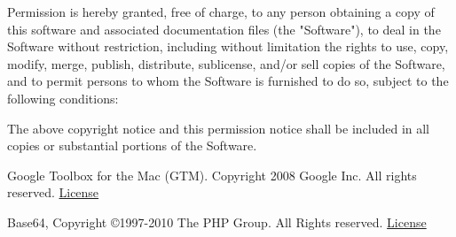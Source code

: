 \documentclass[oneside, openany, 12pt]{tufte-book}
\newcommand{\licensetext}{\scriptsize \setlength{\parskip}{0mm} \singlespacing}
\begin{document}
{\licensetext Permission is hereby granted, free of charge, to any person obtaining a copy
of this software and associated documentation files (the "Software"), to deal
in the Software without restriction, including without limitation the rights
to use, copy, modify, merge, publish, distribute, sublicense, and/or sell
copies of the Software, and to permit persons to whom the Software is
furnished to do so, subject to the following conditions:

The above copyright notice and this permission notice shall be included in
all copies or substantial portions of the Software.}

Google Toolbox for the Mac (GTM). Copyright 2008 Google Inc. All rights reserved. \href{http://www.apache.org/licenses/LICENSE-2.0}{License}

Base64, Copyright \copyright 1997-2010 The PHP Group. All Rights reserved. \href{http://www.php.net/license/3_01.txt}{License}
\end{document}
